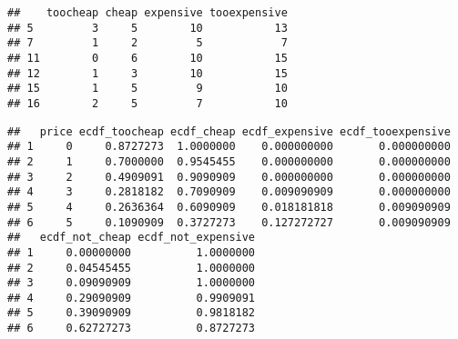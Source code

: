 \documentclass[
]{article}
\newenvironment{Shaded}{\begin{snugshade}}{\end{snugshade}}
\newcommand{\FunctionTok}[1]{\textcolor[rgb]{0.00,0.00,0.00}{#1}}
\newcommand{\NormalTok}[1]{#1}
\newcommand{\SpecialCharTok}[1]{\textcolor[rgb]{0.00,0.00,0.00}{#1}}
\begin{document}
\begin{verbatim}
##    toocheap cheap expensive tooexpensive
## 5         3     5        10           13
## 7         1     2         5            7
## 11        0     6        10           15
## 12        1     3        10           15
## 15        1     5         9           10
## 16        2     5         7           10
\end{verbatim}

\begin{Shaded}
\end{Shaded}

\begin{verbatim}
##   price ecdf_toocheap ecdf_cheap ecdf_expensive ecdf_tooexpensive
## 1     0     0.8727273  1.0000000    0.000000000       0.000000000
## 2     1     0.7000000  0.9545455    0.000000000       0.000000000
## 3     2     0.4909091  0.9090909    0.000000000       0.000000000
## 4     3     0.2818182  0.7090909    0.009090909       0.000000000
## 5     4     0.2636364  0.6090909    0.018181818       0.009090909
## 6     5     0.1090909  0.3727273    0.127272727       0.009090909
##   ecdf_not_cheap ecdf_not_expensive
## 1     0.00000000          1.0000000
## 2     0.04545455          1.0000000
## 3     0.09090909          1.0000000
## 4     0.29090909          0.9909091
## 5     0.39090909          0.9818182
## 6     0.62727273          0.8727273
\end{verbatim}
\end{document}
